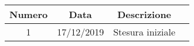 \begin{tabular}{|c | c | c | c|} 
 	\hline
	 Numero & Data & Descrizione \\ [0.5ex] 
	\hline\hline
	1 & 17/12/2019 & Stesura iniziale \\ 
	\hline
\end{tabular}